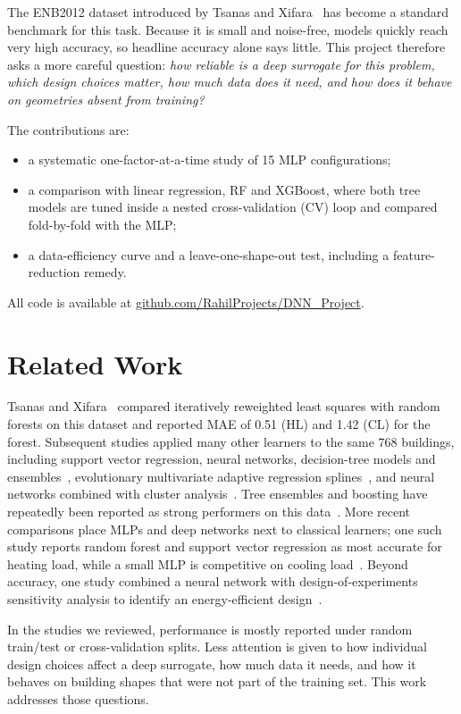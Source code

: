 \documentclass[conference]{IEEEtran}
\begin{document}
The ENB2012 dataset introduced by Tsanas and Xifara~\cite{tsanas} has become a standard benchmark for this task. Because it is small and noise-free, models quickly reach very high accuracy, so headline accuracy alone says little. This project therefore asks a more careful question: \emph{how reliable is a deep surrogate for this problem, which design choices matter, how much data does it need, and how does it behave on geometries absent from training?}

The contributions are:
\begin{itemize}
\item a systematic one-factor-at-a-time study of 15 MLP configurations;
\item a comparison with linear regression, RF and XGBoost, where both tree models are tuned inside a nested cross-validation (CV) loop and compared fold-by-fold with the MLP;
\item a data-efficiency curve and a leave-one-shape-out test, including a feature-reduction remedy.
\end{itemize}
All code is available at \href{https://github.com/RahilProjects/DNN_Project}{github.com/RahilProjects/DNN\_Project}.

\section{Related Work}
Tsanas and Xifara~\cite{tsanas} compared iteratively reweighted least squares with random forests on this dataset and reported MAE of 0.51 (HL) and 1.42 (CL) for the forest. Subsequent studies applied many other learners to the same 768 buildings, including support vector regression, neural networks, decision-tree models and ensembles~\cite{chou}, evolutionary multivariate adaptive regression splines~\cite{cheng}, and neural networks combined with cluster analysis~\cite{aqlan}. Tree ensembles and boosting have repeatedly been reported as strong performers on this data~\cite{ensemble,rte}. More recent comparisons place MLPs and deep networks next to classical learners; one such study reports random forest and support vector regression as most accurate for heating load, while a small MLP is competitive on cooling load~\cite{atici}. Beyond accuracy, one study combined a neural network with design-of-experiments sensitivity analysis to identify an energy-efficient design~\cite{han}.

In the studies we reviewed, performance is mostly reported under random train/test or cross-validation splits. Less attention is given to how individual design choices affect a deep surrogate, how much data it needs, and how it behaves on building shapes that were not part of the training set. This work addresses those questions.
\end{document}
